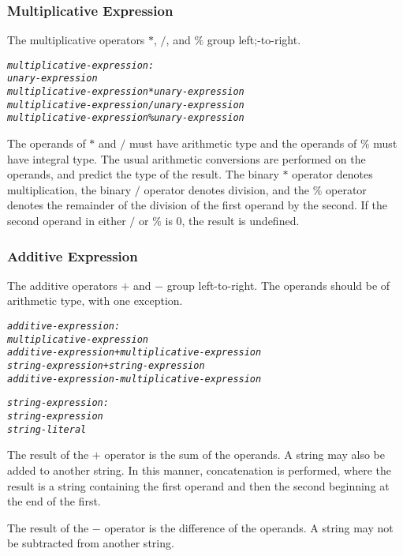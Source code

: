 \documentclass[12pt]{report}
\begin{document}
\subsubsection{Multiplicative Expression}

The multiplicative operators $*$, $/$, and $\%$ group left;-to-right.
\begin{alltt}
         \textit{multiplicative-expression:}
              \textit{unary-expression}
              \textit{multiplicative-expression * unary-expression}
              \textit{multiplicative-expression / unary-expression}
              \textit{multiplicative-expression \% unary-expression}
\end{alltt}
\begin{doublespace}
The operands of $*$ and $/$ must have arithmetic type and the operands of $\%$ must have integral type. The usual arithmetic conversions are performed on the operands, and predict the type of the result.
The binary $*$ operator denotes multiplication, the binary $/$ operator denotes division, and the $\%$ operator denotes the remainder of the division of the first operand by the second. If the second operand in either $/$ or $\%$ is $0$, the result is undefined. 
\end{doublespace}

\subsubsection{Additive Expression}

The additive operators $+$ and $-$ group left-to-right. The operands should be of arithmetic type, with  one exception.
\begin{alltt}
         \textit{additive-expression:}
              \textit{multiplicative-expression}
              \textit{additive-expression + multiplicative-expression}
              \textit{string-expression + string-expression}
              \textit{additive-expression - multiplicative-expression}
              
         \textit{string-expression:}
              \textit{string-expression}
              \textit{string-literal}
\end{alltt}

\begin{doublespace}
The result of the $+$ operator is the sum of the operands. A string may also be added to another string. In this manner, concatenation is performed, where the result is a string containing the first operand and then the second beginning at the end of the first.

The result of the $-$ operator is the difference of the operands. A string may not be subtracted from another string.
\end{doublespace}
\end{document}
